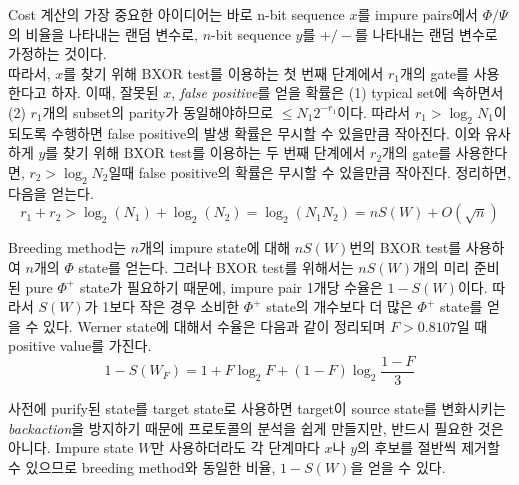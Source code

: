 \documentclass[
]{kaohandt}
\begin{document}
Cost 계산의 가장 중요한 아이디어는 바로 n-bit sequence $x$를 impure pairs에서 $\Phi / \Psi$의 비율을 나타내는 랜덤 변수로, $n$-bit sequence $y$를 $+/-$를 나타내는 랜덤 변수로 가정하는 것이다.\\
따라서, $x$를 찾기 위해 BXOR test를 이용하는 첫 번째 단계에서 $r_1$개의 gate를 사용한다고 하자. 이때, 잘못된 $x$, \textit{false positive}를 얻을 확률은 (1) typical set에 속하면서 (2) $r_1$개의 subset의 parity가 동일해야하므로 $\le N_1 2^{-r_1}$이다. 따라서 $r_1 > \log_2 N_1$이 되도록 수행하면 false positive의 발생 확률은 무시할 수 있을만큼 작아진다.  이와 유사하게 $y$를 찾기 위해 BXOR test를 이용하는 두 번째 단계에서 $r_2$개의 gate를 사용한다면, $r_2 > \log_2 N_2$일때 false positive의 확률은 무시할 수 있을만큼 작아진다. 정리하면, 다음을 얻는다.
\begin{equation}
    r_1 + r_2 > \log_2(N_1) + \log_2 (N_2) = \log_2(N_1N_2) = nS(W) + O(\sqrt n)
\end{equation}

Breeding method는 $n$개의 impure state에 대해 $nS(W)$번의 BXOR test를 사용하여 $n$개의 $\Phi$ state를 얻는다. 그러나 BXOR test를 위해서는 $nS(W)$개의 미리 준비된 pure $\Phi^+$ state가 필요하기 때문에, impure pair 1개당 수율은 $1-S(W)$이다. 따라서 $S(W)$가 1보다 작은 경우 소비한 $\Phi^+$ state의 개수보다 더 많은 $\Phi^+$ state를 얻을 수 있다.
Werner state에 대해서 수율은 다음과 같이 정리되며 $F > 0.8107$일 때 positive value를 가진다.
\begin{equation}
    1-S\left(W_F\right)=1+F \log _2 F+(1-F) \log _2 \frac{1-F}{3}
\end{equation}

사전에 purify된 state를 target state로 사용하면 target이 source state를 변화시키는 \textit{backaction}을 방지하기 때문에 프로토콜의 분석을 쉽게 만들지만, 반드시 필요한 것은 아니다. 
Impure state $W$만 사용하더라도 각 단계마다 $x$나 $y$의 후보를 절반씩 제거할 수 있으므로 breeding method와 동일한 비율, $1 - S(W)$을 얻을 수 있다.
\end{document}
